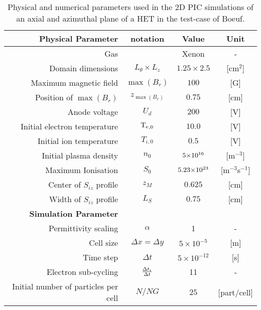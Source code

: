 \begin{table}[htb] %
     \centering
     \caption{\label{tab-parameters-boeuf} Physical and numerical parameters used in the \ac{2D} \ac{PIC} simulations of an axial and azimuthal \ztheta plane of a \ac{HET} in the test-case of Boeuf.}
     \begin{tabular}{@{}r c c c@{}} 
        \toprule
        {\bf Physical Parameter} & notation & Value & Unit \\
        \midrule
        Gas & & Xenon & - \\
        Domain dimensions & $L_{\theta} \times L_{z}$ & $1.25 \times 2.5$ & [cm$^2$] \\
        Maximum magnetic field & $\max(B_{r})$                    & $100$                 & [{G}] \\
        Position of  $\max(B_{r})$   & $z_{\max(B_{r})}$                    & $0.75$      & [cm] \\
        Anode voltage & $U_d$                    & $200$     & [V] \\
        Initial electron temperature & $\mathrm{T_e}_{,0}  $               & $10.0$                 & [{V}] \\
        Initial ion temperature & $T_{i,0}   $               & $0.5$                 & [{V}] \\
        Initial plasma density & $n_0$ & ${{5}{\times}10^{16}}$ &  [{m}$^{-3}$]\\
        Maximum Ionisation & $S_0$ & ${{5.23}{\times}10^{23}}$  & [{m}$^{-3}${s}$^{-1}$]\\
        Center of $S_{iz}$ profile & $z_M$ & $0.625$  & [{cm}]\\
        Width of $S_{iz}$ profile & $L_S$ & $0.75$  & [{cm}]\\
        \midrule
        {\bf Simulation Parameter} &  &   &  \\
        Permittivity scaling & $\alpha$ & 1 & - \\
        Cell size & $\Delta x = \Delta y$ & $5 \times 10^{-5}$  & [{m}] \\
        Time step & $\Delta t  $                      & $5 \times 10^{-12}$ & [{s}] \\
        Electron sub-cycling & $\frac{\Delta t_{i}}{\Delta t}$ & 11 & - \\
        Initial number of particles per cell & $N/NG      $    & $25$   & [{part/cell}] \\
        \bottomrule
     \end{tabular}
  \end{table}



